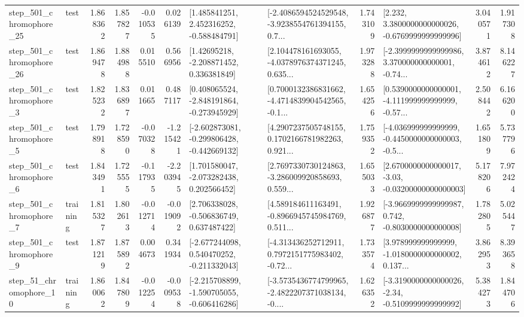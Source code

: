 \begin{tabular}{llrrrrllrlrr}
  step\_501\_chromophore\_25 &      test &      1.868362 &    1.857827 &     -0.010535 &  0.026139 &    [1.485841251, 2.452316252, -0.588484791] &  [-2.4086594524529548, -3.9238554761394155, 0.7... &       1.743109 &   [2.232, 3.3800000000000026, -0.6769999999999996] &            3.040571 &          1.917308 \\
  step\_501\_chromophore\_26 &      test &      1.869478 &    1.884988 &      0.015510 &  0.566956 &     [1.42695218, -2.208871452, 0.336381849] &  [2.104478161693055, -4.0378976374371245, 0.635... &       1.973288 &  [-2.3999999999999986, 3.370000000000001, -0.74... &            3.874612 &          8.146227 \\
   step\_501\_chromophore\_3 &      test &      1.825232 &    1.836897 &      0.011665 &  0.487117 &   [0.408065524, -2.848191864, -0.273945929] &  [0.7000132386831662, -4.4714839904542565, -0.1... &       1.654256 &  [0.5390000000000001, -4.111999999999999, -0.57... &            2.508442 &          6.166200 \\
   step\_501\_chromophore\_5 &      test &      1.798918 &    1.728590 &     -0.070328 & -1.215421 &  [-2.602873081, -0.299806428, -0.442669132] &  [4.2907237505748155, 0.1702166781982263, 0.921... &       1.759352 &  [-4.036999999999999, -0.4450000000000003, -0.5... &            1.651809 &          5.737796 \\
   step\_501\_chromophore\_6 &      test &      1.843491 &    1.725555 &     -0.117935 & -2.203945 &    [1.701580047, -2.073282438, 0.202566452] &  [2.7697330730124863, -3.286009920858693, 0.559... &       1.655033 &  [2.6700000000000017, -3.03, -0.03200000000000003] &            5.178206 &          7.972424 \\
   step\_501\_chromophore\_7 &  training &      1.815327 &    1.802613 &     -0.012714 & -0.019092 &    [2.706338028, -0.506836749, 0.637487422] &  [4.589184611163491, -0.8966945745984769, 0.511... &       1.926877 &  [-3.9669999999999987, 0.742, -0.8030000000000008] &            1.782805 &          5.025447 \\
   step\_501\_chromophore\_9 &      test &      1.871219 &    1.875892 &      0.004673 &  0.341934 &   [-2.677244098, 0.540470252, -0.211332043] &  [-4.313436252712911, 0.7972151775983402, -0.72... &       1.733574 &  [3.978999999999999, -1.0180000000000002, 0.137... &            3.862953 &          8.393658 \\
   step\_51\_chromophore\_10 &  training &      1.860062 &    1.847809 &     -0.012254 & -0.009538 &  [-2.215708899, -1.590705055, -0.606416286] &  [-3.5735436774799965, -2.4822207371038134, -0.... &       1.626352 &  [-3.3190000000000026, -2.34, -0.5109999999999992] &            5.384273 &          1.844706 \\

\end{tabular}
